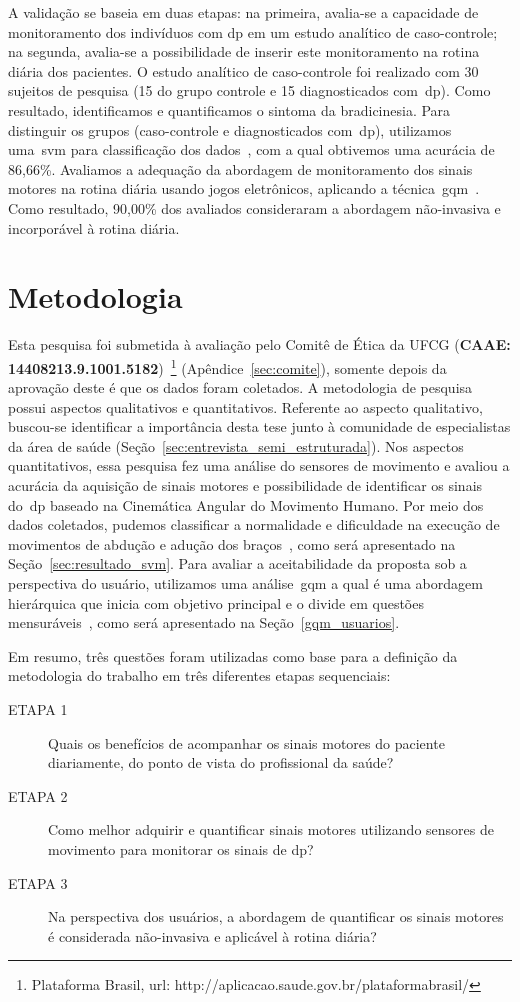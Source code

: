 A validação se baseia em duas etapas: na primeira, avalia-se a capacidade de monitoramento dos indivíduos com \ac{dp} em um estudo analítico de caso-controle; na segunda, avalia-se a possibilidade de inserir este monitoramento na rotina diária dos pacientes. O estudo analítico de caso-controle foi realizado com 30 sujeitos de pesquisa (15 do grupo controle e 15 diagnosticados com~\ac{dp}). Como resultado, identificamos e quantificamos o sintoma da bradicinesia. Para distinguir os grupos (caso-controle e diagnosticados com~\ac{dp}), utilizamos uma~\ac{svm} para classificação dos dados~\cite{datamining2005}, com a qual obtivemos uma acurácia de 86,66\%. Avaliamos a adequação da abordagem de monitoramento dos sinais motores na rotina diária usando jogos eletrônicos, aplicando a técnica~\ac{gqm}~\cite{van1999goal}. Como resultado, 90,00\% dos avaliados consideraram a abordagem não-invasiva e incorporável à rotina diária. 

\section{Metodologia}
Esta pesquisa foi submetida à avaliação pelo Comitê de Ética da UFCG (\textbf{CAAE: 14408213.9.1001.5182})~\footnote{Plataforma Brasil, url: http://aplicacao.saude.gov.br/plataformabrasil/} (Apêndice~\ref{sec:comite}), somente depois da aprovação deste é que os dados foram coletados. A metodologia de pesquisa possui aspectos qualitativos e quantitativos. Referente ao aspecto qualitativo, buscou-se identificar a importância desta tese junto à comunidade de especialistas da área de saúde (Seção~\ref{sec:entrevista_semi_estruturada}). Nos aspectos quantitativos, essa pesquisa fez uma análise do sensores de movimento e avaliou a acurácia da aquisição de sinais motores e possibilidade de identificar os sinais do~\ac{dp} baseado na Cinemática Angular do Movimento Humano. Por meio dos dados coletados, pudemos classificar a normalidade e dificuldade na execução de movimentos de abdução e adução dos braços~\cite{mcginnis2013biomechanics}, como será apresentado na Seção~\ref{sec:resultado_svm}. Para avaliar a aceitabilidade da proposta sob a perspectiva do usuário, utilizamos uma análise~\ac{gqm} a qual é uma abordagem hierárquica que inicia com objetivo principal e o divide em questões mensuráveis~\cite{saraiva2006}, como será apresentado na Seção~\ref{gqm_usuarios}.

Em resumo, três questões foram utilizadas como base para a definição da metodologia do trabalho em três diferentes etapas sequenciais:
	\begin{description}
	\item[ETAPA 1] Quais os benefícios de acompanhar os sinais motores do paciente diariamente, do ponto de vista do profissional da saúde?
	\item[ETAPA 2] Como melhor adquirir e quantificar sinais motores utilizando sensores de movimento para monitorar os sinais de \ac{dp}?
	\item[ETAPA 3] Na perspectiva dos usuários, a abordagem de quantificar os sinais motores é considerada não-invasiva e aplicável à rotina diária?
	\end{description}

